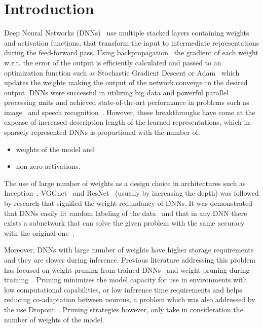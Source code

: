 \documentclass[journal]{IEEEtran}
\begin{document}
\section{Introduction}
Deep Neural Networks (DNNs)~\cite{lecun2015deep} use multiple stacked layers containing weights and activation functions, that transform the input to intermediate representations during the feed-forward pass.
Using backpropagation~\cite{rumelhart1986learning} the gradient of each weight w.r.t. the error of the output is efficiently calculated and passed to an optimization function such as Stochastic Gradient Descent or Adam~\cite{kingma2014adam} which updates the weights making the output of the network converge to the desired output.
DNNs were successful in utilizing big data and powerful parallel processing units and achieved state-of-the-art performance in problems such as image~\cite{krizhevsky2012imagenet} and speech recognition~\cite{graves2013speech}.
However, these breakthroughs have come at the expense of increased description length of the learned representations, which in sparsely represented DNNs is proportional with the number of:
\begin{itemize}
	\item weights of the model and
	\item non-zero activations.
\end{itemize}

The use of large number of weights as a design choice in architectures such as Inception~\cite{szegedy2016rethinking}, VGGnet~\cite{simonyan2014very} and ResNet~\cite{he2016deep} (usually by increasing the depth) was followed by research that signified the weight redundancy of DNNs.
It was demonstrated that DNNs easily fit random labeling of the data~\cite{zhang2016understanding} and that in any DNN there exists a subnetwork that can solve the given problem with the same accuracy with the original one~\cite{frankle2018lottery}.

Moreover, DNNs with large number of weights have higher storage requirements and they are slower during inference.
Previous literature addressing this problem has focused on weight pruning from trained DNNs~\cite{aghasi2017net} and weight pruning during training~\cite{lin2017runtime}.
Pruning minimizes the model capacity for use in environments with low computational capabilities, or low inference time requirements and helps reducing co-adaptation between neurons, a problem which was also addressed by the use Dropout~\cite{srivastava2014dropout}.
Pruning strategies however, only take in consideration the number of weights of the model.
\end{document}
